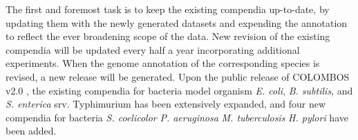 
The first and foremost task is to keep the existing compendia up-to-date, by
updating them with the newly generated datasets and expending the annotation to 
reflect the ever broadening scope of the data.
%
New revision of the existing compendia will be updated every half a year
incorporating additional experiments.
%
When the genome annotation of the corresponding species is revised, a new
release will be generated.
%
Upon the public release of COLOMBOS v2.0 \cite{Meysman2014}, the existing
compendia for bacteria model organism \textit{E. coli}, \textit{B. subtilis},
and \textit{S. enterica} srv. Typhimurium has been extensively expanded, and
four new compendia for bacteria \textit{S. coelicolor} \textit{P. aeruginosa}
\textit{M. tuberculosis} \textit{H. pylori} have been added.



% 
%


